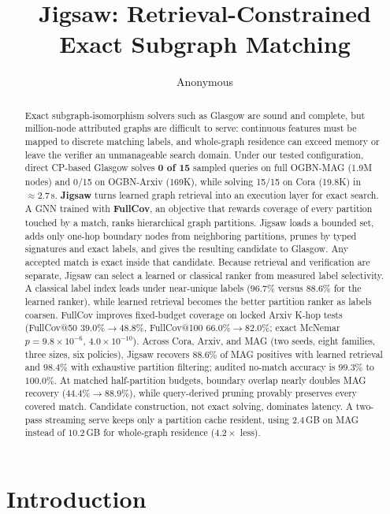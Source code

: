 \documentclass{article}
\title[Jigsaw]{Jigsaw: Retrieval-Constrained Exact Subgraph Matching}
\author[Anonymous]{Anonymous}
\begin{document}
\maketitle

\begin{abstract}
Exact subgraph-isomorphism solvers such as Glasgow are sound and complete, but million-node attributed graphs are difficult to serve: continuous features must be mapped to discrete matching labels, and whole-graph residence can exceed memory or leave the verifier an unmanageable search domain. Under our tested configuration, direct CP-based Glasgow solves \textbf{0 of 15} sampled queries on full OGBN-MAG (1.9M nodes) and 0/15 on OGBN-Arxiv (169K), while solving 15/15 on Cora (19.8K) in ${\approx}2.7$\,s. \textbf{Jigsaw} turns learned graph retrieval into an execution layer for exact search. A GNN trained with \textbf{FullCov}, an objective that rewards coverage of every partition touched by a match, ranks hierarchical graph partitions. Jigsaw loads a bounded set, adds only one-hop boundary nodes from neighboring partitions, prunes by typed signatures and exact labels, and gives the resulting candidate to Glasgow. Any accepted match is exact inside that candidate. Because retrieval and verification are separate, Jigsaw can select a learned or classical ranker from measured label selectivity. A classical label index leads under near-unique labels ($96.7\%$ versus $88.6\%$ for the learned ranker), while learned retrieval becomes the better partition ranker as labels coarsen. FullCov improves fixed-budget coverage on locked Arxiv K-hop tests (FullCov@50 $39.0\%{\to}48.8\%$, FullCov@100 $66.0\%{\to}82.0\%$; exact McNemar $p=9.8{\times}10^{-6}$, $4.0{\times}10^{-10}$). Across Cora, Arxiv, and MAG (two seeds, eight families, three sizes, six policies), Jigsaw recovers $88.6\%$ of MAG positives with learned retrieval and $98.4\%$ with exhaustive partition filtering; audited no-match accuracy is $99.3\%$ to $100.0\%$. At matched half-partition budgets, boundary overlap nearly doubles MAG recovery ($44.4\%{\to}88.9\%$), while query-derived pruning provably preserves every covered match. Candidate construction, not exact solving, dominates latency. A two-pass streaming serve keeps only a partition cache resident, using $2.4$\,GB on MAG instead of $10.2$\,GB for whole-graph residence ($4.2\times$ less).
\end{abstract}


\section{Introduction}
\end{document}
